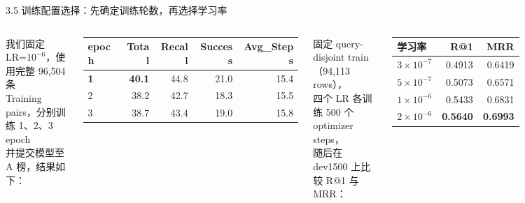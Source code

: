\begin{frame}{3.5 训练配置选择：先确定训练轮数，再选择学习率}
    \begin{columns}[T,onlytextwidth]
        {\centering\small 我们固定 LR=$10^{-6}$，使用完整 96,504 条 \\ Training pairs，分别训练 1、2、3 epoch \\ 并提交模型至 A 榜，结果如下：\par}
        {\centering\scriptsize
        \begin{tabular}{lrrrr}
            \toprule
                epoch & Total & Recall & Success & Avg\_Steps \\
                \midrule
                \rowcolor{softBlue}\textbf{1} & \textbf{40.1} & 44.8 & 21.0 & 15.4 \\
                2 & 38.2 & 42.7 & 18.3 & 15.5 \\
                3 & 38.7 & 43.4 & 19.0 & 15.8 \\
            \bottomrule
        \end{tabular}
        \par}

        {\centering\small 固定 query-disjoint train（94,113 rows），\\ 四个 LR 各训练 500 个 optimizer steps，\\ 随后在 dev1500 上比较 R@1 与 MRR：\par}
        {\centering\scriptsize
        \begin{tabular}{lrr}
            \toprule
            学习率 & R@1 & MRR \\
            \midrule
            $3\times10^{-7}$ & 0.4913 & 0.6419 \\
            $5\times10^{-7}$ & 0.5073 & 0.6571 \\
            $1\times10^{-6}$ & 0.5433 & 0.6831 \\
            \rowcolor{softBlue}\textbf{$2\times10^{-6}$} & \textbf{0.5640} & \textbf{0.6993} \\
            \bottomrule
        \end{tabular}\par}
        \par
    \end{columns}
    \begin{center}
    \end{center}
\end{frame}
